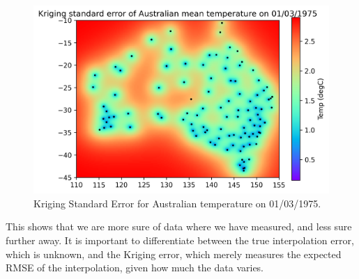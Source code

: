 \documentclass[12pt,a4paper]{article} %
\begin{document}
\begin{figure}[!ht]
    \centering
    \includegraphics[width=.8\linewidth]{mean_temp_model_krig_error.png}
    \caption{Kriging Standard Error for Australian temperature on 01/03/1975.}
    \label{fig:krig_err}
\end{figure}

This shows that we are more sure of data where we have measured, and less sure further away. It is important to differentiate between the true interpolation error, which is unknown, and the Kriging error, which merely measures the expected RMSE of the interpolation, given how much the data varies.
\end{document}
